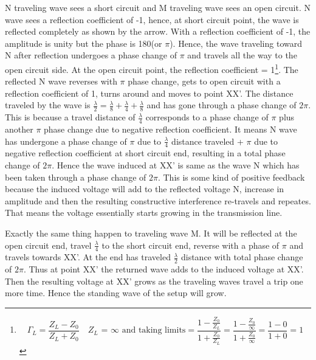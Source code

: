  N traveling wave sees a short circuit and M traveling wave sees an open circuit. N wave sees a reflection coefficient of -1, hence, at short circuit point, the wave is reflected completely as shown by the arrow. With a reflection coefficient of -1, the amplitude is unity but the phase is 180\textdegree (or $\pi$). Hence, the wave traveling toward N after reflection undergoes a phase change of $\pi$ and travels all the way to the open circuit side. At the open circuit point, the reflection coefficient = 1\footnote{
\begin{dmath*}
\Gamma_{L} = \frac{Z_{L} - Z_0}{Z_{L} + Z_0}\quad Z_{L}\text{ = }\infty\text{ and taking limits}
= \frac{1 - \frac{Z_0}{Z_{L}}}{1 + \frac{Z_0}{Z_{L}}}
= \frac{1 - \frac{Z_0}\infty}{1 + \frac{Z_0}\infty}
= \frac{1 - 0}{1 + 0}
= 1
\end{dmath*}
}. The reflected N wave reverses with $\pi$ phase change, gets to open circuit with a reflection coefficient of 1, turns around and moves to point XX'. The distance traveled by the wave is $ \frac{\lambda}{2} = \frac{\lambda}{8} + \frac{\lambda}{4} + \frac{\lambda}{8}$ and has gone through a phase change of $2\pi$. This is because a travel distance of $\frac{\lambda}{4}$ corresponds to a phase change of $\pi$ plus another $\pi$ phase change due to negative reflection coefficient. It means N wave has undergone a phase change of $\pi$ due to $\frac{\lambda }{4}$ distance traveled + $\pi$ due to negative reflection coefficient at short circuit end, resulting in a total phase change of $2\pi$. Hence the wave induced at XX' is same as the wave N which has been taken through a phase change of $2\pi$. This is some kind of positive feedback because the induced voltage will add to the reflected voltage N, increase in amplitude and then the resulting constructive interference re-travels and repeates. That means the voltage essentially starts growing in the transmission line.

Exactly the same thing happen to traveling wave M. It will be reflected at the open circuit end, travel $\frac{\lambda}{4}$ to the short circuit end, reverse with a phase of $\pi$ and travels towards XX'. At the end has traveled $\frac{\lambda }{2}$ distance with total phase change of $2\pi$. Thus at point XX' the returned wave adds to the induced voltage at XX'. Then the resulting voltage at XX' grows as the traveling waves travel a trip one more time. Hence the standing wave of the setup will grow.

